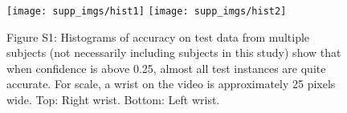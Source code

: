 \documentclass{article}
\begin{document}
\addtolength{\topmargin}{0.5in}





\begin{figure}[h!]
\centering
\texttt{[image: supp\_imgs/hist1]}
\texttt{[image: supp\_imgs/hist2]}
\caption*{Figure S1: Histograms of accuracy on test data from multiple subjects (not necessarily including subjects in this study) show that when confidence is above 0.25, almost all test instances are quite accurate. For scale, a wrist on the video is approximately 25 pixels wide. Top: Right wrist. Bottom: Left wrist. }
\label{fig:hist}
\end{figure}

\newpage
\end{document}
